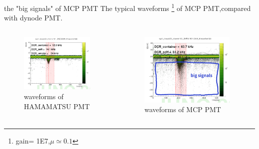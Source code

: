 \documentclass[11pt,compress,xcolor=x11names,UTF8]{beamer}
\begin{document}
\begin{frame}{the "big signals" of MCP PMT}
	The typical waveforms \footnote{gain= 1E7,$\mu\simeq 0.1$} of MCP PMT,compared with dynode PMT. 
\begin{columns}
\begin{column}{.485\textwidth}
\begin{figure}
\centering
\includegraphics[width=0.94\textwidth]{figure/hamamp.png} %
\caption{waveforms of HAMAMATSU PMT}
\end{figure}
\end{column}
\begin{column}{.485\textwidth}
\begin{figure}
\centering
\includegraphics[width=0.94\textwidth]{figure/mcpamp.png} %
\caption{waveforms of MCP PMT}
\end{figure}
\end{column}
\end{columns}
\end{frame}
\end{document}

